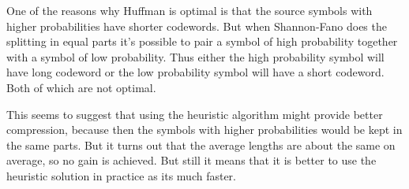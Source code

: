 \documentclass{article}
\begin{document}
One of the reasons why Huffman is optimal is that the source symbols with higher probabilities have shorter codewords. But when Shannon-Fano does the splitting in equal parts it's possible to pair a symbol of high probability together with a symbol of low probability. Thus either the high probability symbol will have long codeword or the low probability symbol will have a short codeword. Both of which are not optimal.

This seems to suggest that using the heuristic algorithm might provide better compression, because then the symbols with higher probabilities would be kept in the same parts. But it turns out that the average lengths are about the same on average, so no gain is achieved. But still it means that it is better to use the heuristic solution in practice as its much faster.
\end{document}
